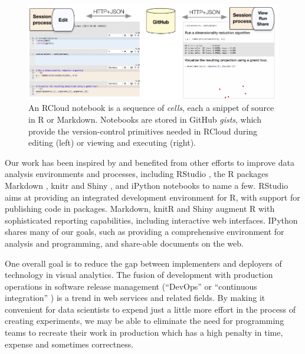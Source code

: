 \begin{figure}
\centering
\includegraphics[width=.8\linewidth]{fig/notebook/notebook.pdf}
\caption{\label{fig:notebook}An RCloud notebook is a sequence of
  \emph{cells}, each a snippet of source in R or Markdown. Notebooks
  are stored in GitHub \emph{gists}, which provide the version-control
  primitives needed in RCloud during editing (left) or viewing and
  executing (right).}
\end{figure}

Our work has been inspired by and benefited from other efforts
to improve data analysis environments and processes,
including RStudio \cite{RStudio:2013:SWA},
the R packages Markdown \cite{Allaire:2014:MMR},
knitr \cite{Xie:2013:DDW}
and Shiny \cite{RStudio:2013:SWA},
and iPython notebooks \cite{Perez:2007:IAS}
to name a few. RStudio aims at providing an integrated development environment
for R, with support for publishing code in packages. Markdown,
knitR and Shiny augment R with sophisticated reporting capabilities, including
interactive web interfaces. IPython \cite{Perez:2007:IAS}
shares many of our goals, such as providing a comprehensive environment
for analysis and programming, and share-able documents on the web.

One overall goal is to reduce the gap between implementers and deployers
of technology in visual analytics. The fusion of development with production
operations in software release management (``DevOps'' \cite{Httermann:2012:DD}
or ``continuous integration'' \cite{Fowler:2006:Continuous}) is a trend in web
services and related fields.
By making it convenient for data scientists to expend just a little more effort
in the process of creating experiments, we may be able to eliminate the need
for programming teams to recreate their work in production which has a high
penalty in time, expense and sometimes correctness.

